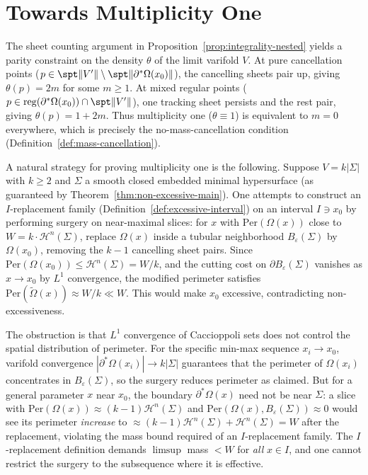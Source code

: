 
\section{Towards Multiplicity One}\label{sec:multiplicity-one}

The sheet counting argument in Proposition~\ref{prop:integrality-nested} yields a parity constraint on the density $\theta$ of the limit varifold $V$. At pure cancellation points ($p \in \spt\|V'\| \setminus \spt\|\partial^*\Omega(x_0)\|$), the cancelling sheets pair up, giving $\theta(p) = 2m$ for some $m \geq 1$. At mixed regular points ($p \in \mathrm{reg}(\partial^*\Omega(x_0)) \cap \spt\|V'\|$), one tracking sheet persists and the rest pair, giving $\theta(p) = 1 + 2m$. Thus multiplicity one ($\theta \equiv 1$) is equivalent to $m = 0$ everywhere, which is precisely the no-mass-cancellation condition (Definition~\ref{def:mass-cancellation}).

A natural strategy for proving multiplicity one is the following. Suppose $V = k|\Sigma|$ with $k \geq 2$ and $\Sigma$ a smooth closed embedded minimal hypersurface (as guaranteed by Theorem~\ref{thm:non-excessive-main}). One attempts to construct an $I$-replacement family (Definition~\ref{def:excessive-interval}) on an interval $I \ni x_0$ by performing surgery on near-maximal slices: for $x$ with $\mathrm{Per}(\Omega(x))$ close to $W = k \cdot \mathcal{H}^n(\Sigma)$, replace $\Omega(x)$ inside a tubular neighborhood $B_\varepsilon(\Sigma)$ by $\Omega(x_0)$, removing the $k - 1$ cancelling sheet pairs. Since $\mathrm{Per}(\Omega(x_0)) \leq \mathcal{H}^n(\Sigma) = W/k$, and the cutting cost on $\partial B_\varepsilon(\Sigma)$ vanishes as $x \to x_0$ by $L^1$ convergence, the modified perimeter satisfies $\mathrm{Per}(\tilde{\Omega}(x)) \approx W/k \ll W$. This would make $x_0$ excessive, contradicting non-excessiveness.

The obstruction is that $L^1$ convergence of Caccioppoli sets does not control the spatial distribution of perimeter. For the specific min-max sequence $x_i \to x_0$, varifold convergence $|\partial^*\Omega(x_i)| \to k|\Sigma|$ guarantees that the perimeter of $\Omega(x_i)$ concentrates in $B_\varepsilon(\Sigma)$, so the surgery reduces perimeter as claimed. But for a general parameter $x$ near $x_0$, the boundary $\partial^*\Omega(x)$ need not be near $\Sigma$: a slice with $\mathrm{Per}(\Omega(x)) \approx (k-1)\mathcal{H}^n(\Sigma)$ and $\mathrm{Per}(\Omega(x), B_\varepsilon(\Sigma)) \approx 0$ would see its perimeter \emph{increase} to $\approx (k-1)\mathcal{H}^n(\Sigma) + \mathcal{H}^n(\Sigma) = W$ after the replacement, violating the mass bound required of an $I$-replacement family. The $I$-replacement definition demands $\limsup$ mass $< W$ for \emph{all} $x \in I$, and one cannot restrict the surgery to the subsequence where it is effective.

